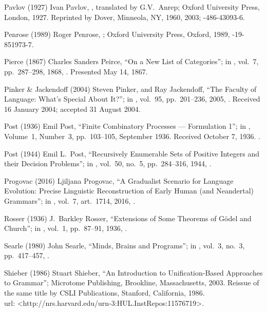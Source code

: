  Pavlov (1927)
Ivan Pavlov,
,
translated by G.V.\ Anrep;
Oxford University Press, London, 1927.
Reprinted by Dover, Minneola, NY, 1960, 2003;
-486-43093-6.

 Penrose (1989)
Roger Penrose, \negthinspace
{};
Oxford University Press, Oxford, 1989,
-19-851973-7.

 Pierce (1867)
Charles Sanders Peirce,
``On a New List of Categories'';
in ,
vol.\ 7, pp.\ 287--298, 1868,
.
Presented May 14, 1867.

 Pinker \& Jackendoff (2004)
Steven Pinker, and Ray Jackendoff,
``The Faculty of Language: What’s Special About It?'';
in ,
vol.\ 95, pp.\ 201--236, 2005,
.
Received 16 January 2004; accepted 31 August 2004.

 Post (1936)
Emil Post,
``Finite Combinatory Processes --- Formulation 1'';
in ,
Volume\ 1, Number\ 3, pp.~103--105, September 1936.
Received October 7, 1936.
.

 Post (1944)
Emil L.\ Post,
``Recursively Enumerable Sets of Positive Integers
  and their Decision Problems'';
in ,
vol.\ 50, no.~5, pp.\ 284--316, 1944,
.

 Progovac (2016)
Ljiljana Progovac,
``A Gradualist
Scenario for Language Evolution:
Precise Linguistic Reconstruction of
Early Human (and Neandertal) Grammars'';
in ,
vol.\ 7, art.\ 1714, 2016,
.

 Rosser (1936)
J.\ Barkley Rosser,
``Extensions of Some Theorems of G\"odel and Church'';
in ,
vol.\ 1, pp.\ 87--91, 1936,
.

 Searle (1980)
John Searle,
``Minds, Brains and Programs'';
in ,
vol.\ 3, no.\ 3, pp.\ 417--457,
.

 Shieber (1986)
Stuart Shieber,
``An Introduction to Unification-Based Approaches to Grammar'';
Microtome Publishing, Brookline, Massachusetts, 2003.
Reissue of the same title by
CSLI Publications, Stanford, California, 1986.\\
{\sc url:} \URL<http://nrs.harvard.edu/urn-3:HUL.InstRepos:11576719>.

